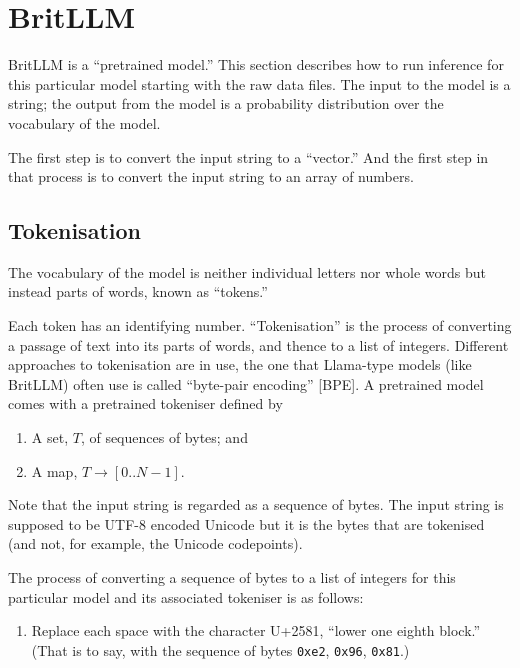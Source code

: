 \documentclass[11pt, a4paper]{article}
\begin{document}
\section{BritLLM}

BritLLM is a ``pretrained model.'' This section describes how to run
inference for this particular model starting with the raw data
files. The input to the model is a string; the output from the model
is a probability distribution over the vocabulary of the model.

The first step is to convert the input string to a ``vector.'' And the
first step in that process is to convert the input string to an array
of numbers.

\subsection{Tokenisation}

The vocabulary of the model is neither individual letters nor whole
words but instead parts of words, known as ``tokens.''

Each token has an identifying number. ``Tokenisation'' is the process
of converting a passage of text into its parts of words, and thence to
a list of integers. Different approaches to tokenisation are in use,
the one that Llama-type models (like BritLLM) often use is called
``byte-pair encoding'' [BPE]. A pretrained model comes with a
pretrained tokeniser defined
by
\begin{enumerate}
\item A set, $T$, of sequences of bytes; and
  \item A map, $T\to [0 .. N-1]$.
\end{enumerate}
Note that the input string is regarded as a sequence of bytes. The
input string is supposed to be UTF-8 encoded Unicode but it is the
bytes that are tokenised (and not, for example, the Unicode
codepoints).

The process of converting a sequence of bytes to a list of integers
for this particular model and its associated tokeniser is as follows:
\begin{enumerate}
\item Replace each space with the character U+2581, ``lower one eighth
  block.'' (That is to say, with the sequence of bytes \verb|0xe2|,
  \verb|0x96|, \verb|0x81|.)
\end{enumerate}
\end{document}
